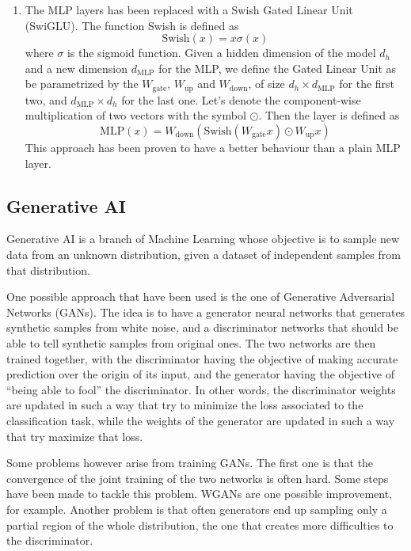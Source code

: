 \documentclass[]{marticle}
\begin{document}
\begin{enumerate}
\item The MLP layers has been replaced with a Swish Gated Linear Unit (SwiGLU). The function Swish
is defined as
$$ \text{Swish}(x) = x \sigma(x) $$
where $\sigma$ is the sigmoid function. Given a hidden dimension of the model $d_h$ and a new
dimension $d_\text{MLP}$ for the MLP, we define the Gated Linear Unit as be parametrized by the
$W_\text{gate}$, $W_\text{up}$ and $W_\text{down}$, of size $d_h\times d_\text{MLP}$ for the first
two, and $d_\text{MLP} \times d_h$ for the last one. Let's denote the component-wise multiplication
of two vectors with the symbol $\odot$. Then the layer is defined as $$ \text{MLP}(x) =
W_\text{down} (\text{Swish}(W_\text{gate} x) \odot W_\text{up} x) $$ This approach has been proven
to have a better behaviour than a plain MLP layer.
\end{enumerate}

\subsection{Generative AI} \label{sec:gen-ai}

Generative AI is a branch of Machine Learning whose objective is to sample new data from an unknown
distribution, given a dataset of independent samples from that distribution.

One possible approach that have been used is the one of Generative Adversarial Networks
(GANs)\cite{gans}. The idea is to have a generator neural networks that generates synthetic samples
from white noise, and a discriminator networks that should be able to tell synthetic samples from
original ones. The two networks are then trained together, with the discriminator having the
objective of making accurate prediction over the origin of its input, and the generator having the
objective of ``being able to fool'' the discriminator. In other words, the discriminator weights are
updated in such a way that try to minimize the loss associated to the classification task, while the
weights of the generator are updated in such a way that try maximize that loss.

Some problems however arise from training GANs. The first one is that the convergence of the joint
training of the two networks is often hard. Some steps have been made to tackle this problem. WGANs
\cite{wgans} are one possible improvement, for example. Another problem is that often generators end
up sampling only a partial region of the whole distribution, the one that creates more difficulties
to the discriminator.
\end{document}
